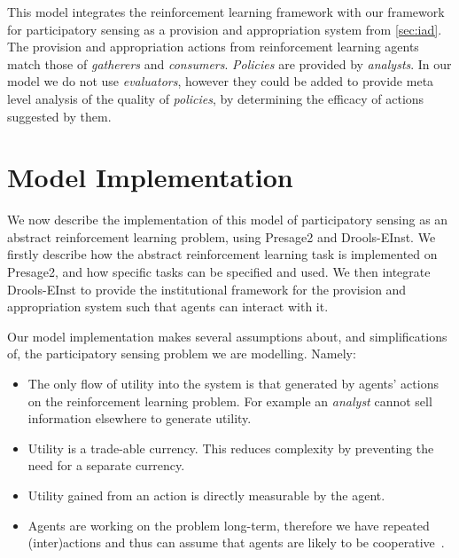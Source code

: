 This model integrates the reinforcement learning framework with our framework
for participatory sensing as a provision and appropriation system from
\autoref{sec:iad}. The provision and appropriation actions from reinforcement
learning agents match those of \emph{gatherers} and \emph{consumers}.
\emph{Policies} are provided by \emph{analysts}. In our model we do not use
\emph{evaluators}, however they could be added to provide meta level analysis
of the quality of \emph{policies}, by determining the efficacy of actions
suggested by them.



\section{Model Implementation}

We now describe the implementation of this model of participatory sensing as an abstract reinforcement learning problem, using Presage2 and Drools-EInst. We firstly describe how the abstract reinforcement learning task is implemented on Presage2, and how specific tasks can be specified and used. We then integrate Drools-EInst to provide the institutional framework for the provision and appropriation system such that agents can interact with it. 

Our model implementation makes several assumptions about, and simplifications of, the participatory sensing problem we are modelling. Namely:

\begin{itemize}
\item The only flow of utility into the system is that generated by agents' actions on the reinforcement learning problem. For example an \emph{analyst} cannot sell information elsewhere to generate utility.
\item Utility is a trade-able currency. This reduces complexity by preventing the need for a separate currency.
\item Utility gained from an action is directly measurable by the agent.
\item Agents are working on the problem long-term, therefore we have repeated (inter)actions and thus can assume that agents are likely to be cooperative~\citep{Axelrod1984}.
\end{itemize}

